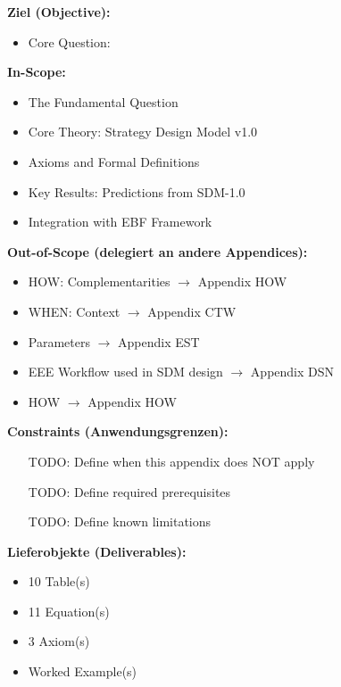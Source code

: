 \begin{tcolorbox}[
    colback=orange!5!white,
    colframe=orange!75!black,
    title={\textbf{Appendix Scope: Ziel / In-Scope / Out-of-Scope / Constraints}},
    fonttitle=\bfseries
]

\textbf{Ziel (Objective):}
\begin{itemize}[nosep]
    \item Core Question:
\end{itemize}

\textbf{In-Scope:}
\begin{itemize}[nosep]
    \item The Fundamental Question
    \item Core Theory: Strategy Design Model v1.0
    \item Axioms and Formal Definitions
    \item Key Results: Predictions from SDM-1.0
    \item Integration with EBF Framework
\end{itemize}

\textbf{Out-of-Scope (delegiert an andere Appendices):}
\begin{itemize}[nosep]
    \item HOW: Complementarities $\rightarrow$ Appendix HOW
    \item WHEN: Context $\rightarrow$ Appendix CTW
    \item Parameters $\rightarrow$ Appendix EST
    \item EEE Workflow used in SDM design $\rightarrow$ Appendix DSN
    \item HOW $\rightarrow$ Appendix HOW
\end{itemize}

\textbf{Constraints (Anwendungsgrenzen):}
\begin{itemize}[nosep]
    \item [TODO: Define when this appendix does NOT apply]
    \item [TODO: Define required prerequisites]
    \item [TODO: Define known limitations]
\end{itemize}

\textbf{Lieferobjekte (Deliverables):}
\begin{itemize}[nosep]
    \item 10 Table(s)
    \item 11 Equation(s)
    \item 3 Axiom(s)
    \item Worked Example(s)
\end{itemize}

\end{tcolorbox}


